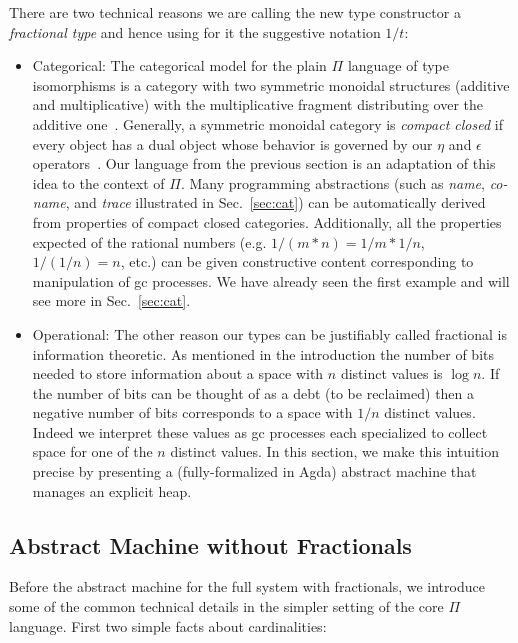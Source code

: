 \documentclass[sigplan,10pt,review,anonymous]{acmart}
\newcommand{\oneover}[1]{1/#1}
\begin{document}
There are two technical reasons we are calling the new type constructor a
\emph{fractional type} and hence using for it the suggestive notation
$\oneover{t}$:
\begin{itemize}
\item Categorical: The categorical model for the plain $\Pi$ language
  of type isomorphisms is a category with two symmetric monoidal
  structures (additive and multiplicative) with the multiplicative
  fragment distributing over the additive one~\cite{XXX}. Generally,
  a symmetric monoidal category is \emph{compact closed} if every
  object has a dual object whose behavior is governed by our $\eta$
  and $\epsilon$ operators~\cite{XXX}. Our language from the previous
  section is an adaptation of this idea to the context of $\Pi$. Many
  programming abstractions (such as \emph{name}, \emph{co-name}, and
  \emph{trace} illustrated in Sec.~\ref{sec:cat}) can be automatically
  derived from properties of compact closed categories. Additionally,
  all the properties expected of the rational numbers
  (e.g. $\oneover{(m*n)} = \oneover{m}*\oneover{n}$,
  $\oneover{(\oneover{n})}=n$, etc.) can be given constructive content
  corresponding to manipulation of gc processes. We have already seen
  the first example and will see more in Sec.~\ref{sec:cat}.

\item Operational: The other reason our types can be justifiably
  called fractional is information theoretic. As mentioned in the
  introduction the number of bits needed to store information about a
  space with $n$ distinct values is $\log{n}$. If the number of bits
  can be thought of as a debt (to be reclaimed) then a negative number
  of bits corresponds to a space with $\oneover{n}$ distinct
  values. Indeed we interpret these values as gc processes each
  specialized to collect space for one of the $n$ distinct values. In
  this section, we make this intuition precise by presenting a
  (fully-formalized in Agda) abstract machine that manages an explicit
  heap. 
\end{itemize}

\subsection{Abstract Machine without Fractionals}

Before the abstract machine for the full system with
fractionals, we introduce some of the common technical details in the
simpler setting of the core $\Pi$ language. First two simple facts
about cardinalities:
\end{document}
